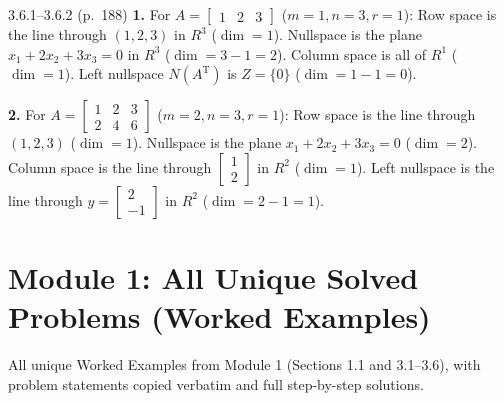 \documentclass[11pt,a4paper,openany,oneside]{book}
\def\vect#1{#1}%
\def\mathbf#1{#1}%
\newcommand{\vect}[1]{\mathbf{#1}}
\newcommand{\T}{\mathrm{T}}
\numberwithin{equation}{chapter}
\begin{document}
\vfill
\begin{pageend_sol}{3.6.1--3.6.2 (p.\ 188)}
\textbf{1.} For $A = \begin{bmatrix}1 & 2 & 3\end{bmatrix}$ ($m=1, n=3, r=1$): Row space is the line through $(1,2,3)$ in $\mathbf{R}^3$ ($\dim = 1$). Nullspace is the plane $x_1+2x_2+3x_3=0$ in $\mathbf{R}^3$ ($\dim = 3-1 = 2$). Column space is all of $\mathbf{R}^1$ ($\dim = 1$). Left nullspace $N(A^\T)$ is $\mathbf{Z} = \{0\}$ ($\dim = 1-1 = 0$).

\textbf{2.} For $A = \begin{bmatrix}1 & 2 & 3\\2 & 4 & 6\end{bmatrix}$ ($m=2, n=3, r=1$): Row space is the line through $(1,2,3)$ ($\dim = 1$). Nullspace is the plane $x_1+2x_2+3x_3=0$ ($\dim = 2$). Column space is the line through $\begin{bmatrix}1\\2\end{bmatrix}$ in $\mathbf{R}^2$ ($\dim = 1$). Left nullspace is the line through $\vect{y} = \begin{bmatrix}2\\-1\end{bmatrix}$ in $\mathbf{R}^2$ ($\dim = 2-1 = 1$).
\end{pageend_sol}
\clearpage

\chapter[Module 1: Unique Solved Problems]{Module 1: All Unique Solved Problems (Worked Examples)}

\begin{syll}
All unique Worked Examples from Module 1 (Sections 1.1 and 3.1--3.6), with problem statements copied verbatim and full step-by-step solutions.
\end{syll}
\end{document}
